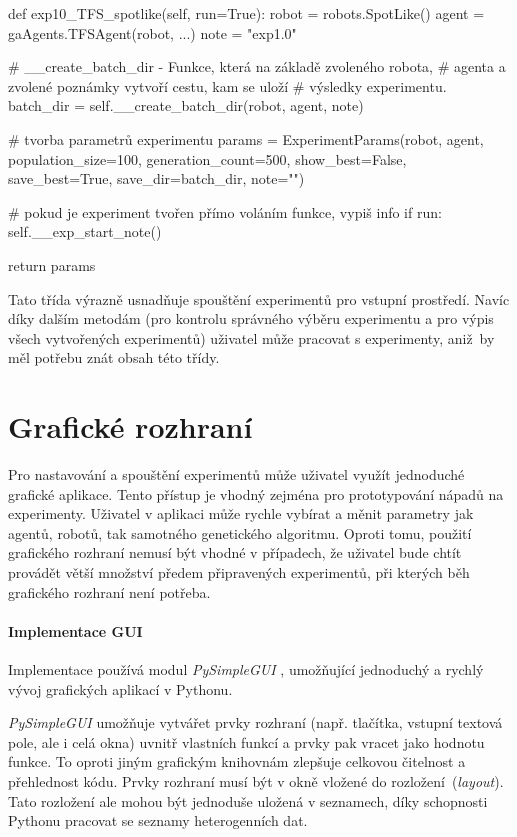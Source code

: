 \begin{code}
def exp10_TFS_spotlike(self, run=True):
    robot = robots.SpotLike()
    agent = gaAgents.TFSAgent(robot, ...)
    note = "exp1.0"

    # __create_batch_dir - Funkce, která na základě zvoleného robota, 
    # agenta a zvolené poznámky vytvoří cestu, kam se uloží 
    # výsledky experimentu.
    batch_dir = self.__create_batch_dir(robot, agent, note) 

    # tvorba parametrů experimentu
    params = ExperimentParams(robot, 
                              agent,
                              population_size=100,
                              generation_count=500,
                              show_best=False,
                              save_best=True,
                              save_dir=batch_dir,
                              note="")

    # pokud je experiment tvořen přímo voláním funkce, vypiš info
    if run: 
        self.__exp_start_note()

    return params
\end{code}

Tato třída výrazně usnadňuje spouštění experimentů pro vstupní prostředí. Navíc
díky dalším metodám (pro kontrolu správného výběru experimentu a pro výpis
všech vytvořených experimentů) uživatel může pracovat s experimenty,
aniž~by měl potřebu znát obsah této třídy.

\section{Grafické rozhraní} \label{imp:GUI}
Pro nastavování a spouštění experimentů může uživatel využít jednoduché
grafické aplikace. Tento přístup je vhodný zejména pro prototypování nápadů na
experimenty. Uživatel v aplikaci může rychle vybírat a měnit parametry jak
agentů, robotů, tak samotného genetického algoritmu. Oproti tomu, použití
grafického rozhraní nemusí být vhodné v případech, že uživatel bude chtít
provádět větší množství předem připravených experimentů, při kterých běh
grafického rozhraní není potřeba.

\paragraph{Implementace GUI}
Implementace používá modul \emph{PySimpleGUI} \citep{pysimplegui}, umožňující
jednoduchý a rychlý vývoj grafických aplikací v Pythonu. 

\emph{PySimpleGUI} umožňuje vytvářet prvky rozhraní (např.
tlačítka, vstupní textová pole, ale i celá okna) uvnitř vlastních funkcí a
prvky pak vracet jako hodnotu funkce. To oproti jiným grafickým knihovnám
zlepšuje celkovou čitelnost a přehlednost kódu. Prvky rozhraní musí být v okně
vložené do rozložení~(\emph{layout}). Tato rozložení ale mohou být jednoduše
uložená v seznamech, díky schopnosti Pythonu pracovat se seznamy
heterogenních dat.

